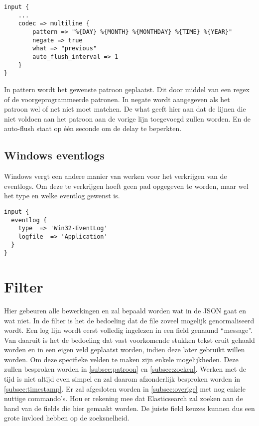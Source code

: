 \lstset{escapechar=@,style=customc}  
\begin{lstlisting}[frame=single]  
input {
	...
	codec => multiline {
		pattern => "%{DAY} %{MONTH} %{MONTHDAY} %{TIME} %{YEAR}"
		negate => true
		what => "previous"
		auto_flush_interval => 1
	}
}
\end{lstlisting}

In pattern wordt het gewenste patroon geplaatst. Dit door middel van een regex of de voorgeprogrammeerde patronen. In negate wordt aangegeven als het patroon wel of net niet moet matchen. De what geeft hier aan dat de lijnen die niet voldoen aan het patroon aan de vorige lijn toegevoegd zullen worden. En de auto-flush staat op één seconde om de delay te beperkten.


\subsection{Windows eventlogs}
\label{subsec:windows-eventlogs}

Windows vergt een andere manier van werken voor het verkrijgen van de eventlogs. Om deze te verkrijgen hoeft geen pad opgegeven te worden, maar wel het type en welke eventlog gewenst is. 

\lstset{escapechar=@,style=customc}  
\begin{lstlisting}[frame=single]  
input {
  eventlog {
    type  => 'Win32-EventLog'
    logfile  => 'Application'
  }
}
\end{lstlisting}

\section{Filter}
\label{sec:filter}

Hier gebeuren alle bewerkingen en zal bepaald worden wat in de JSON gaat en wat niet. In de filter is het de bedoeling dat de file zoveel mogelijk genormaliseerd wordt. Een log lijn wordt eerst volledig ingelezen in een field  genaamd “message”. Van daaruit is het de bedoeling dat vast voorkomende stukken tekst eruit gehaald worden en in een eigen veld geplaatst worden, indien deze later gebruikt willen worden.  Om deze specifieke velden te maken zijn enkele mogelijkheden. Deze zullen besproken worden in \ref{subsec:patroon} en \ref{subsec:zoeken}. Werken met de tijd is niet altijd even simpel en zal daarom afzonderlijk besproken worden in \ref{subsec:timestamp}. Er zal afgesloten worden in \ref{subsec:overige} met nog enkele nuttige commando’s. 
Hou er rekening mee dat Elasticsearch zal zoeken aan de hand van de fields die hier gemaakt worden. De juiste field keuzes kunnen dus een grote invloed hebben op de zoeksnelheid.


